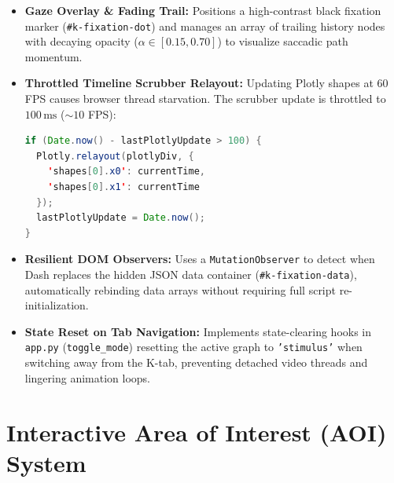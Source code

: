 \documentclass[11pt,a4paper]{article}
\begin{document}
\begin{itemize}
    \item \textbf{Gaze Overlay \& Fading Trail:} Positions a high-contrast black fixation marker (\texttt{\#k-fixation-dot}) and manages an array of trailing history nodes with decaying opacity ($\alpha \in [0.15, 0.70]$) to visualize saccadic path momentum.
    \item \textbf{Throttled Timeline Scrubber Relayout:} Updating Plotly shapes at 60 FPS causes browser thread starvation. The scrubber update is throttled to $100\,\text{ms}$ ($\sim 10$ FPS):
    \begin{lstlisting}[language=Java]
if (Date.now() - lastPlotlyUpdate > 100) {
  Plotly.relayout(plotlyDiv, {
    'shapes[0].x0': currentTime,
    'shapes[0].x1': currentTime
  });
  lastPlotlyUpdate = Date.now();
}
    \end{lstlisting}
    \item \textbf{Resilient DOM Observers:} Uses a \texttt{MutationObserver} to detect when Dash replaces the hidden JSON data container (\texttt{\#k-fixation-data}), automatically rebinding data arrays without requiring full script re-initialization.
    \item \textbf{State Reset on Tab Navigation:} Implements state-clearing hooks in \texttt{app.py} (\texttt{toggle\_mode}) resetting the active graph to \texttt{'stimulus'} when switching away from the K-tab, preventing detached video threads and lingering animation loops.
\end{itemize}

\section{Interactive Area of Interest (AOI) System}
\label{sec:aoi_system}
\end{document}
